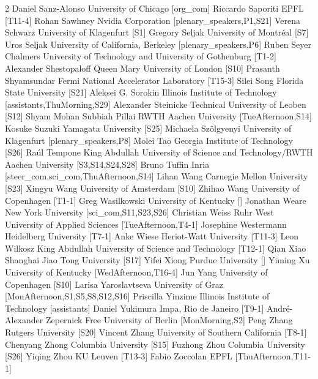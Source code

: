 \documentclass[12pt,lettersize,oneside]{book} %
\begin{document}
\begin{multicols}{2}
  {Daniel Sanz-Alonso}
  {University of Chicago}
  [org_com]
\participantne
  {Riccardo Saporiti}
  {EPFL}
  [T11-4]
\participantne
  {Rohan Sawhney}
  {Nvidia Corporation}
  [plenary_speakers,P1,S21]
\participantne
  {Verena Schwarz}
  {University of Klagenfurt}
  [S1]
\participantne
  {Gregory Seljak}
  {University of Montr\'eal}
  [S7]
\participantne
  {Uros Seljak}
  {University of California, Berkeley}
  [plenary_speakers,P6]
\participantne
  {Ruben Seyer}
  {Chalmers University of Technology and University of Gothenburg}
  [T1-2]
\participantne
  {Alexander Shestopaloff}
  {Queen Mary University of London}
  [S10]
\participantne
  {Prasanth Shyamsundar}
  {Fermi National Accelerator Laboratory}
  [T15-3]
\participantne
  {Silei Song}
  {Florida State University}
  [S21]
\participantne
  {Aleksei G. Sorokin}
  {Illinois Institute of Technology}
  [assistants,ThuMorning,S29]
\participantne
  {Alexander Steinicke}
  {Technical University of Leoben}
  [S12]
\participantne
  {Shyam Mohan Subbiah Pillai}
  {RWTH Aachen University}
  [TueAfternoon,S14]
\participantne
  {Kosuke Suzuki}
  {Yamagata University}
  [S25]
\participantne
  {Michaela Sz\"olgyenyi}
  {University of Klagenfurt}
  [plenary_speakers,P8]
\participantne
  {Molei Tao}
  {Georgia Institute of Technology}
  [S26]
\participantne
  {Ra\'ul Tempone}
  {King Abdullah University of Science and Technology/RWTH Aachen University}
  [S3,S14,S24,S28]
\participantne
  {Bruno Tuffin}
  {Inria}
  [steer_com,sci_com,ThuAfternoon,S14]
\participantne
  {Lihan Wang}
  {Carnegie Mellon University}
  [S23]
\participantne
  {Xingyu Wang}
  {University of Amsterdam}
  [S10]
\participantne
  {Zhihao Wang}
  {University of Copenhagen}
  [T1-1]
\participantne
  {Greg Wasilkowski}
  {University of Kentucky}
  []
\participantne
  {Jonathan Weare}
  {New York University}
  [sci_com,S11,S23,S26]
\participantne
  {Christian Weiss}
  {Ruhr West University of Applied Sciences}
  [TueAfternoon,T4-1]
\participantne
  {Josephine Westermann}
  {Heidelberg University}
  [T7-1]
\participantne
  {Anke Wiese}
  {Heriot-Watt University}
  [T11-3]
\participantne
  {Leon Wilkosz}
  {King Abdullah University of Science and Technology}
  [T12-1]
\participantne
  {Qian Xiao}
  {Shanghai Jiao Tong University}
  [S17]
\participantne
  {Yifei Xiong}
  {Purdue University}
  []
\participantne
  {Yiming Xu}
  {University of Kentucky}
  [WedAfternoon,T16-4]
\participantne
  {Jun Yang}
  {University of Copenhagen}
  [S10]
\participantne
  {Larisa Yaroslavtseva}
  {University of Graz}
  [MonAfternoon,S1,S5,S8,S12,S16]
\participantne
  {Priscilla Yinzime}
  {Illinois Institute of Technology}
  [assistants]
\participantne
  {Daniel Yukimura}
  {Impa, Rio de Janeiro}
  [T9-1]
\participantne
  {Andr\'e-Alexander Zepernick}
  {Free University of Berlin}
  [MonMorning,S2]
\participantne
  {Peng Zhang}
  {Rutgers University}
  [S20]
\participantne
  {Vincent Zhang}
  {University of Southern California}
  [T8-1]
\participantne
  {Chenyang Zhong}
  {Columbia University}
  [S15]
\participantne
  {Fuzhong Zhou}
  {Columbia University}
  [S26]
\participantne
  {Yiqing Zhou}
  {KU Leuven}
  [T13-3]
\participantne
  {Fabio Zoccolan}
  {EPFL}
  [ThuAfternoon,T11-1]
\end{multicols}

 
\end{document}
